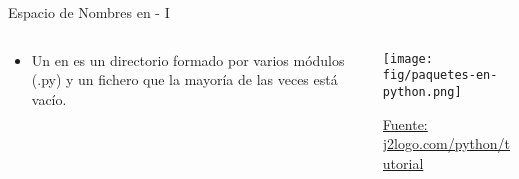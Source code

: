 \documentclass[10pt,envcountsect,spanish]{beamer}
\begin{document}
\begin{frame}{Espacio de Nombres en  - I }
\begin{columns}
\begin{column}{.6\textwidth}
\begin{itemize}
\item Un  en  es un directorio formado por varios módulos (.py) y un fichero  que la mayoría de las veces está vacío.
\end{itemize}

\end{column}
\begin{column}{.3\textwidth}
	\centerline{\texttt{[image: fig/paquetes-en-python.png]}}
	{\tiny \href{https://j2logo.com/python/tutorial/espacios-de-nombres-modulos-y-paquetes/}{Fuente: j2logo.com/python/tutorial}}
\end{column}
\end{columns}


\end{frame}
\end{document}
